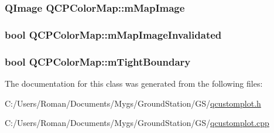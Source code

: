 \subsubsection[{m\+Map\+Image}]{\setlength{\rightskip}{0pt plus 5cm}Q\+Image Q\+C\+P\+Color\+Map\+::m\+Map\+Image\hspace{0.3cm}{\ttfamily [protected]}}\label{class_q_c_p_color_map_a66110813b42eca78b64095b2a1f285a0}
\hypertarget{class_q_c_p_color_map_ac9aea6a5c193d7fa866bc7b26e79ef2c}{}
\subsubsection[{m\+Map\+Image\+Invalidated}]{\setlength{\rightskip}{0pt plus 5cm}bool Q\+C\+P\+Color\+Map\+::m\+Map\+Image\+Invalidated\hspace{0.3cm}{\ttfamily [protected]}}\label{class_q_c_p_color_map_ac9aea6a5c193d7fa866bc7b26e79ef2c}
\hypertarget{class_q_c_p_color_map_ac2e9425fe4381b496726e1c09f978302}{}
\subsubsection[{m\+Tight\+Boundary}]{\setlength{\rightskip}{0pt plus 5cm}bool Q\+C\+P\+Color\+Map\+::m\+Tight\+Boundary\hspace{0.3cm}{\ttfamily [protected]}}\label{class_q_c_p_color_map_ac2e9425fe4381b496726e1c09f978302}


The documentation for this class was generated from the following files\+:\begin{DoxyCompactItemize}
\item 
C\+:/\+Users/\+Roman/\+Documents/\+Mygs/\+Ground\+Station/\+G\+S/\hyperlink{qcustomplot_8h}{qcustomplot.\+h}\item 
C\+:/\+Users/\+Roman/\+Documents/\+Mygs/\+Ground\+Station/\+G\+S/\hyperlink{qcustomplot_8cpp}{qcustomplot.\+cpp}\end{DoxyCompactItemize}
